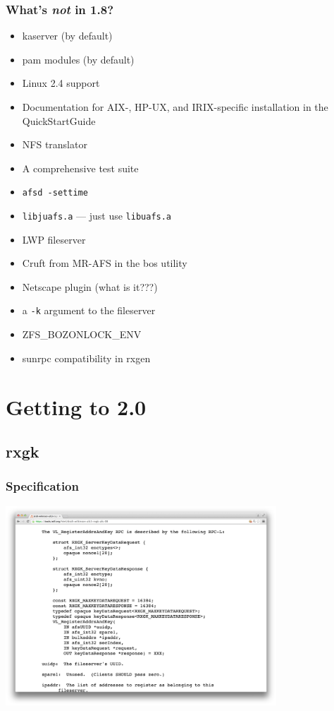 \documentclass{beamer}
\begin{document}
\begin{frame}[fragile]
\frametitle{What's {\em not} in 1.8?}
\begin{itemize}
\item{kaserver (by default)}
\item{pam modules (by default)}
\item{Linux 2.4 support}
\item{Documentation for AIX-, HP-UX, and IRIX-specific installation in the
QuickStartGuide}
\item{NFS translator}
\item{A comprehensive test suite}
\item{\verb+afsd -settime+}
\item{\verb+libjuafs.a+ --- just use \verb+libuafs.a+}
\item{LWP fileserver}
\item{Cruft from MR-AFS in the bos utility}
\item{Netscape plugin (what is it???)}
\item{a \verb+-k+ argument to the fileserver}
\item{ZFS\_BOZONLOCK\_ENV}
\item{sunrpc compatibility in rxgen}
\end{itemize}
\end{frame}

\section{Getting to 2.0}

\subsection{rxgk}

\begin{frame}
\frametitle{Specification}
\includegraphics[width=4in]{rxgk-afs-snapshot}
\end{frame}
\end{document}
